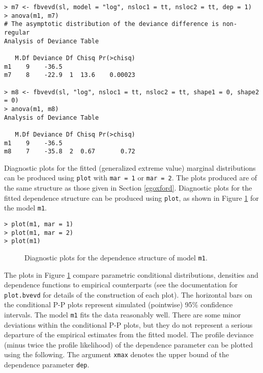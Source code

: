 \documentclass[11pt,a4paper]{article}
\begin{document}
\begin{verbatim}
> m7 <- fbvevd(sl, model = "log", nsloc1 = tt, nsloc2 = tt, dep = 1)
> anova(m1, m7)
# The asymptotic distribution of the deviance difference is non-regular
Analysis of Deviance Table

   M.Df Deviance Df Chisq Pr(>chisq)
m1    9    -36.5                    
m7    8    -22.9  1  13.6    0.00023

> m8 <- fbvevd(sl, "log", nsloc1 = tt, nsloc2 = tt, shape1 = 0, shape2 = 0)
> anova(m1, m8)
Analysis of Deviance Table

   M.Df Deviance Df Chisq Pr(>chisq)
m1    9    -36.5
m8    7    -35.8  2  0.67       0.72
\end{verbatim}

Diagnostic plots for the fitted (generalized extreme value) marginal distributions can be produced using \verb+plot+ with \verb+mar = 1+ or \verb+mar = 2+.
The plots produced are of the same structure as those given in Section \ref{egoxford}.
Diagnostic plots for the fitted dependence structure can be produced using \verb+plot+, as shown in Figure \ref{seadiag} for the model \verb+m1+.

\begin{verbatim}
> plot(m1, mar = 1)
> plot(m1, mar = 2)
> plot(m1)
\end{verbatim}

\begin{figure}
\begin{center}
\vspace{-1.5cm}
\hspace{0cm}
\hspace{0cm}
\hspace{0cm}
\end{center} 
\caption{Diagnostic plots for the dependence structure of model \texttt{m1}.}
\label{seadiag}
\end{figure}

The plots in Figure \ref{seadiag} compare parametric conditional distributions, densities and dependence functions to empirical counterparts (see the documentation for \verb+plot.bvevd+ for details of the construction of each plot). 
The horizontal bars on the conditional P-P plots represent simulated (pointwise) 95\% confidence intervals.
The model \verb+m1+ fits the data reasonably well.
There are some minor deviations within the conditional P-P plots, but they do not represent a serious departure of the empirical estimates from the fitted model.
The profile deviance (minus twice the profile likelihood) of the dependence parameter can be plotted using the following.
The argument \verb+xmax+ denotes the upper bound of the dependence parameter \verb+dep+.
\end{document}
